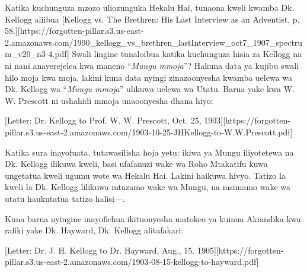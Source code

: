 Katika kuchunguza mzozo uliozunguka Hekalu Hai, tunaona kweli kwamba Dk. Kellogg aliibua [Kellogg vs. The Brethren: His Last Interview as an Adventist, p. 58.][https://forgotten-pillar.s3.us-east-2.amazonaws.com/1990\_kellogg\_vs\_brethren\_lastInterview\_oct7\_1907\_spectrum\_v20\_n3-4.pdf] Swali lingine tunaloibua katika kuchunguza hisia za Kellogg na  ni nani anayerejelea kwa maneno “\textit{Mungu mmoja}”? Hakuna data ya kujibu swali hilo moja kwa moja, lakini kuna data nyingi zinazoonyesha kwamba uelewa wa Dk. Kellogg wa “\textit{Mungu mmoja}” ulikuwa uelewa wa Utatu. Barua yake kwa W. W. Prescott ni ushahidi mmoja unaoonyesha dhana hiyo:


[Letter: Dr. Kellogg to Prof. W. W. Prescott, Oct. 25, 1903][https://forgotten-pillar.s3.us-east-2.amazonaws.com/1903-10-25-JHKellogg-to-W.W.Prescott.pdf]


Katika sura inayofuata, tutawasilisha hoja yetu: ikiwa  ya Mungu iliyotetewa na Dk. Kellogg ilikuwa kweli, basi ufafanuzi wake wa Roho Mtakatifu kuwa  ungetatua kweli ugumu wote wa Hekalu Hai. Lakini haikuwa hivyo. Tatizo la kweli la Dk. Kellogg lilikuwa mtazamo wake wa Mungu, na msimamo wake wa utatu haukutatua tatizo halisi—.


Kuna barua nyingine inayofichua ikituonyesha matokeo ya kuinua  Akiandika kwa rafiki yake Dk. Hayward, Dk. Kellogg alitafakari:




[Letter: Dr. J. H. Kellogg to Dr. Hayward, Aug., 15. 1905][https://forgotten-pillar.s3.us-east-2.amazonaws.com/1903-08-15-kellogg-to-hayward.pdf]


